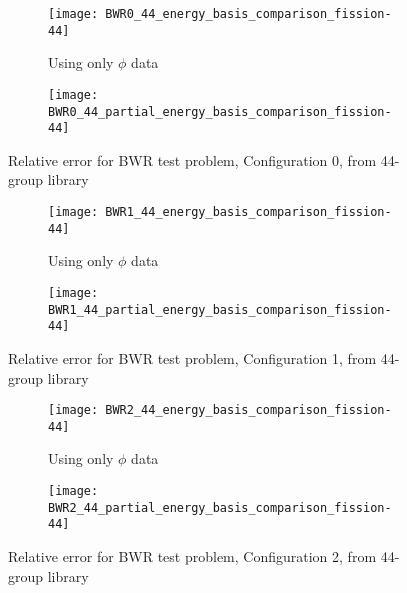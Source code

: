 \documentclass[5p,times,twocolumn,10pt]{elsarticle}
\begin{document}
  \begin{figure*}[!ht]
    \centering
    \begin{subfigure}{0.5\textwidth}
      \centering
      \texttt{[image: BWR0\_44\_energy\_basis\_comparison\_fission-44]}
      \caption{Using only $\phi$ data}
      \label{fig:core0-44a}
    \end{subfigure}%
    \begin{subfigure}{0.5\textwidth}
      \centering
      \texttt{[image: BWR0\_44\_partial\_energy\_basis\_comparison\_fission-44]}
      \label{fig:core0-44b} 
    \end{subfigure}
    \caption{Relative error for BWR test problem, Configuration 0, from 44-group library}
    \label{fig:core0-44}
  \end{figure*}
  
  \begin{figure*}[!ht]
    \centering
    \begin{subfigure}{0.5\textwidth}
      \centering
      \texttt{[image: BWR1\_44\_energy\_basis\_comparison\_fission-44]}
      \caption{Using only $\phi$ data}
      \label{fig:core1-44a}
    \end{subfigure}%
    \begin{subfigure}{0.5\textwidth}
      \centering
      \texttt{[image: BWR1\_44\_partial\_energy\_basis\_comparison\_fission-44]}
      \label{fig:core1-44b} 
    \end{subfigure}
    \caption{Relative error for BWR test problem, Configuration 1, from 44-group library}
    \label{fig:core1-44}
  \end{figure*}
  
  \begin{figure*}[!ht]
    \centering
    \begin{subfigure}{0.5\textwidth}
      \centering
      \texttt{[image: BWR2\_44\_energy\_basis\_comparison\_fission-44]}
      \caption{Using only $\phi$ data}
      \label{fig:core2-44a}
    \end{subfigure}%
    \begin{subfigure}{0.5\textwidth}
      \centering
      \texttt{[image: BWR2\_44\_partial\_energy\_basis\_comparison\_fission-44]}
      \label{fig:core2-44b} 
    \end{subfigure}
    \caption{Relative error for BWR test problem, Configuration 2, from 44-group library}
    \label{fig:core2-44}
  \end{figure*}
  
\end{document}
